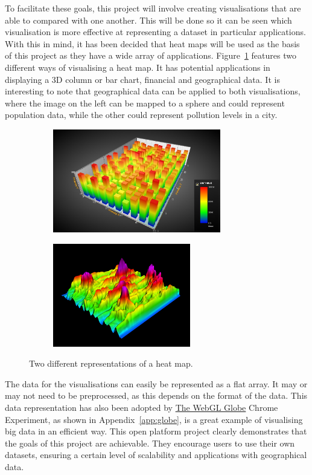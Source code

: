 \documentclass[a4paper]{article}
\begin{document}
{		To facilitate these goals, this project will involve creating visualisations that are able to compared with one another. This will be done so it can be seen which visualisation is more effective at representing a dataset in particular applications. With this in mind, it has been decided that heat maps will be used as the basis of this project as they have a wide array of applications. Figure~\ref{fig:heat_maps} features two different ways of visualising a heat map. It has potential applications in displaying a 3D column or bar chart, financial and geographical data. It is interesting to note that geographical data can be applied to both visualisations, where the image on the left can be mapped to a sphere and could represent population data, while the other could represent pollution levels in a city.
		
		\begin{figure}[H]
			\begin{subfigure}[b]{0.5\textwidth}
                \includegraphics[width=\textwidth,height=4.5cm]{images/heat-map-1}
	        \end{subfigure}
	        \begin{subfigure}[b]{0.5\textwidth}
                \includegraphics[width=\textwidth,height=4.5cm]{images/heat-map-2}
	        \end{subfigure}
			\caption{Two different representations of a heat map. \citep{tuomainen2014financial} \citep{fuchs2006physiological}}
			\label{fig:heat_maps}
		\end{figure}
		
		The data for the visualisations can easily be represented as a flat array. It may or may not need to be preprocessed, as this depends on the format of the data. This data representation has also been adopted by \href{https://www.chromeexperiments.com/globe}{The WebGL Globe} Chrome Experiment, as shown in Appendix~\ref{app:globe}, is a great example of visualising big data in an efficient way. This open platform project clearly demonstrates that the goals of this project are achievable. They encourage users to use their own datasets, ensuring a certain level of scalability and applications with geographical data.
		
}
\end{document}
